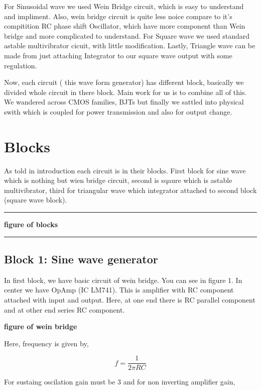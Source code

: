 \documentclass{article}
\begin{document}
For Sinusoidal wave we used Wein Bridge circuit, which is easy to understand and impliment. Also, wein bridge circuit is quite less noice compare to it's compitition RC phase shift Oscillator, which have more component than Wein bridge and more complicated to understand. For Square wave we used standard astable multivibrator cicuit, with little modification. Lastly, Triangle wave can be made from just attaching Integrator to our square wave output with some regulation.

Now, each circuit ( this wave form generator) has different block, basically we divided whole circuit in there block. Main work for us is to combine all of this. We wandered across CMOS families, BJTs but finally we sattled into physical swith which is coupled for power transmission and also for output change.

\section{Blocks}
\label{sec:org7e6afdd}


As told in introduction each circuit is in their blocks. First block for sine wave which is nothing but wien bridge circuit, second is sqaure which is astable multivibrator, third for triangular wave which integrator attached to second block (square wave block).

\noindent\rule{\textwidth}{0.5pt}
\textbf{\textbf{figure of blocks}}

\noindent\rule{\textwidth}{0.5pt}

\subsection{Block 1: Sine wave generator}
\label{sec:org112bf96}


In first block, we have basic circuit of wein bridge. You can see in figure 1. In center we have OpAmp (IC LM741). This is amplifier with RC component attached with input and output. Here, at one end there is RC parallel component and at other end series RC component. 

\textbf{\textbf{figure of wein bridge}}

Here, frequency is given by, 

\begin{equation}
\label{eq:org056e263}
  f =\frac{1}{2 \pi RC}
\end{equation}

For sustaing oscilation gain must be 3 and for non inverting amplifier gain, 
\end{document}
